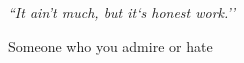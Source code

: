 \documentclass[a4paper, 12pt, twoside, openright]{Thesis}  %
\begin{document}
\frontmatter	           %






\fancyhead{}        %
\rhead{\thepage}    %
\lhead{}            %
\pagestyle{fancy}   %
\clearpage          %

\pagestyle{empty}   %
\null\vfill

\vfill\vfill\vfill\vfill\vfill\vfill\null
\clearpage          %



\pagestyle{empty}  %

\null\vfill
\textit{``It ain't much, but it`s honest work.''}
\begin{flushright}
  Someone who you admire or hate
\end{flushright}

\vfill\vfill\vfill\vfill\vfill\vfill\null
\clearpage  %

%
%
%
\end{document}
